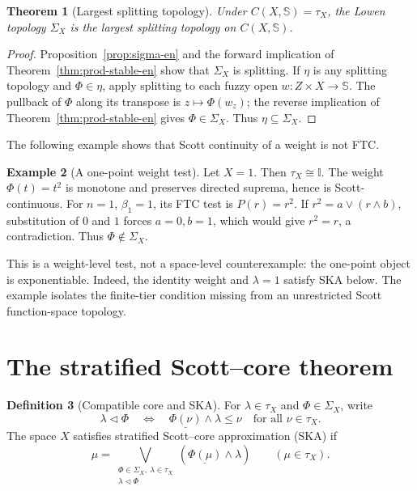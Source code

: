 \documentclass[11pt,a4paper]{article}
\numberwithin{equation}{section}
\newtheorem{theorem}{Theorem}[section]
\theoremstyle{definition}
\newtheorem{definition}[theorem]{Definition}
\newtheorem{example}[theorem]{Example}
\theoremstyle{remark}
\newcommand{\I}{\mathbb I}
\newcommand{\Sier}{\mathbb S}
\newcommand{\const}[1]{\underline{#1}}
\begin{document}
\begin{theorem}[Largest splitting topology]\label{thm:max-split-en}
Under \(C(X,\Sier)=\tau_X\), the Lowen topology \(\Sigma_X\) is the
largest splitting topology on \(C(X,\Sier)\).
\end{theorem}

\begin{proof}
Proposition~\ref{prop:sigma-en} and the forward implication of
Theorem~\ref{thm:prod-stable-en} show that \(\Sigma_X\) is splitting.
If \(\eta\) is any splitting topology and \(\Phi\in\eta\), apply
splitting to each fuzzy open \(w:Z\times X\to\Sier\).  The pullback of
\(\Phi\) along its transpose is \(z\mapsto\Phi(w_z)\); the reverse
implication of Theorem~\ref{thm:prod-stable-en} gives
\(\Phi\in\Sigma_X\).  Thus \(\eta\subseteq\Sigma_X\).
\end{proof}

The following example shows that Scott continuity of a weight is not FTC.

\begin{example}[A one-point weight test]
Let \(X=1\).  Then \(\tau_X\cong\I\).  The weight
\(\Phi(t)=t^2\) is monotone and preserves directed suprema, hence is
Scott-continuous.  For \(n=1\), \(\beta_1=1\), its FTC test is
\(P(r)=r^2\).  If \(r^2=a\vee(r\wedge b)\), substitution of \(0\) and
\(1\) forces \(a=0,b=1\), which would give \(r^2=r\), a contradiction.
Thus \(\Phi\notin\Sigma_X\).
\end{example}

This is a weight-level test, not a space-level counterexample: the
one-point object is exponentiable.  Indeed, the identity weight and
\(\lambda=1\) satisfy SKA below.  The example isolates the finite-tier
condition missing from an unrestricted Scott function-space topology.

\section{The stratified Scott--core theorem}

\begin{definition}[Compatible core and SKA]\label{def:ska-en}
For \(\lambda\in\tau_X\) and \(\Phi\in\Sigma_X\), write
\begin{equation}\label{eq:triangle-en}
 \lambda\triangleleft\Phi
 \quad\Longleftrightarrow\quad
 \const{\Phi(\nu)}\wedge\lambda\leq\nu
 \quad\text{for all }\nu\in\tau_X.
\end{equation}
The space \(X\) satisfies stratified Scott--core approximation (SKA) if
\begin{equation}\label{eq:ska-en}
  \mu=\bigvee_{\substack{\Phi\in\Sigma_X,\ \lambda\in\tau_X\\
                         \lambda\triangleleft\Phi}}
       (\const{\Phi(\mu)}\wedge\lambda)
 \qquad(\mu\in\tau_X).
\end{equation}
\end{definition}
\end{document}
